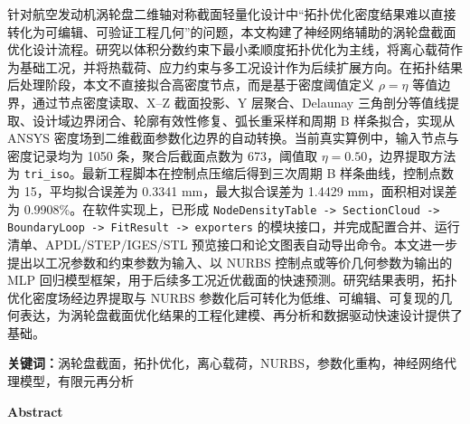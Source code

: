 \documentclass{FRB-style}
\newcommand{\fronttitle}[1]{%
  \begin{center}{\heiti\zihao{3}\bfseries #1}\end{center}\vspace{0.5\baselineskip}%
}
\newcommand{\codepath}[1]{\texttt{#1}}
\begin{document}
针对航空发动机涡轮盘二维轴对称截面轻量化设计中“拓扑优化密度结果难以直接转化为可编辑、可验证工程几何”的问题，本文构建了神经网络辅助的涡轮盘截面优化设计流程。研究以体积分数约束下最小柔顺度拓扑优化为主线，将离心载荷作为基础工况，并将热载荷、应力约束与多工况设计作为后续扩展方向。在拓扑结果后处理阶段，本文不直接拟合高密度节点，而是基于密度阈值定义 $\rho=\eta$ 等值边界，通过节点密度读取、X--Z 截面投影、Y 层聚合、Delaunay 三角剖分等值线提取、设计域边界闭合、轮廓有效性修复、弧长重采样和周期 B 样条拟合，实现从 ANSYS 密度场到二维截面参数化边界的自动转换。当前真实算例中，输入节点与密度记录均为 1050 条，聚合后截面点数为 673，阈值取 $\eta=0.50$，边界提取方法为 \codepath{tri\_iso}。最新工程脚本在控制点压缩后得到三次周期 B 样条曲线，控制点数为 15，平均拟合误差为 0.3341 mm，最大拟合误差为 1.4429 mm，面积相对误差为 0.9908\%。在软件实现上，已形成 \codepath{NodeDensityTable -> SectionCloud -> BoundaryLoop -> FitResult -> exporters} 的模块接口，并完成配置合并、运行清单、APDL/STEP/IGES/STL 预览接口和论文图表自动导出命令。本文进一步提出以工况参数和约束参数为输入、以 NURBS 控制点或等价几何参数为输出的 MLP 回归模型框架，用于后续多工况近优截面的快速预测。研究结果表明，拓扑优化密度场经边界提取与 NURBS 参数化后可转化为低维、可编辑、可复现的几何表达，为涡轮盘截面优化结果的工程化建模、再分析和数据驱动快速设计提供了基础。

\noindent\textbf{关键词：}涡轮盘截面，拓扑优化，离心载荷，NURBS，参数化重构，神经网络代理模型，有限元再分析

\clearpage
\fronttitle{Abstract}
{}
\end{document}
